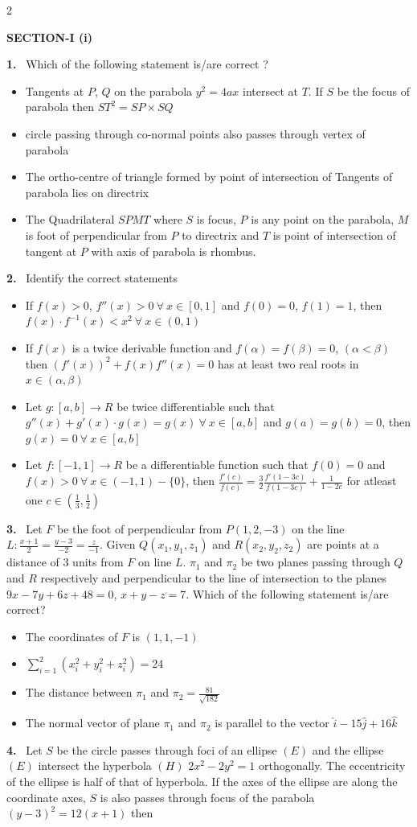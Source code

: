 \documentclass[10pt]{extarticle}
\newcommand{\partsec}[2]{\par\medskip\noindent{\large\bfseries PART-#1: #2}\par\smallskip}
\newcommand{\sect}[1]{\par\smallskip\noindent\textbf{#1}\par}
\newcommand{\qn}[1]{\par\smallskip\noindent\textbf{#1.}~}
\newenvironment{qoptions}{\begin{itemize}[leftmargin=1.8em,itemsep=1pt,topsep=2pt,label={}]}{\end{itemize}}
\newcommand{\opt}[2]{\item[(#1)] #2}
\begin{document}
\begin{multicols}{2}
\partsec{3}{MATHEMATICS}
\sect{SECTION-I (i)}
\qn{1} Which of the following statement is/are correct ?
\begin{qoptions}
\opt{A}{Tangents at $P$, $Q$ on the parabola $y^2=4ax$ intersect at $T$. If $S$ be the focus of parabola then $ST^2=SP\times SQ$}
\opt{B}{circle passing through co-normal points also passes through vertex of parabola}
\opt{C}{The ortho-centre of triangle formed by point of intersection of Tangents of parabola lies on directrix}
\opt{D}{The Quadrilateral $SPMT$ where $S$ is focus, $P$ is any point on the parabola, $M$ is foot of perpendicular from $P$ to directrix and $T$ is point of intersection of tangent at $P$ with axis of parabola is rhombus.}
\end{qoptions}
\qn{2} Identify the correct statements
\begin{qoptions}
\opt{A}{If $f(x)>0$, $f''(x)>0\ \forall\ x\in[0,1]$ and $f(0)=0$, $f(1)=1$, then $f(x)\cdot f^{-1}(x)<x^2\ \forall\ x\in(0,1)$}
\opt{B}{If $f(x)$ is a twice derivable function and $f(\alpha)=f(\beta)=0$, $(\alpha<\beta)$ then $(f'(x))^2+f(x)f''(x)=0$ has at least two real roots in $x\in(\alpha,\beta)$}
\opt{C}{Let $g:[a,b]\rightarrow R$ be twice differentiable such that $g''(x)+g'(x)\cdot g(x)=g(x)\ \forall\ x\in[a,b]$ and $g(a)=g(b)=0$, then $g(x)=0\ \forall\ x\in[a,b]$}
\opt{D}{Let $f:[-1,1]\rightarrow R$ be a differentiable function such that $f(0)=0$ and $f(x)>0\ \forall\ x\in(-1,1)-\{0\}$, then $\frac{f'(c)}{f(c)}=\frac32\frac{f'(1-3c)}{f(1-3c)}+\frac{1}{1-2c}$ for atleast one $c\in\left(\frac13,\frac12\right)$}
\end{qoptions}
\qn{3} Let $F$ be the foot of perpendicular from $P(1,2,-3)$ on the line $L:\frac{x+1}{2}=\frac{y-3}{-2}=\frac{z}{-1}$. Given $Q(x_1,y_1,z_1)$ and $R(x_2,y_2,z_2)$ are points at a distance of 3 units from $F$ on line $L$. $\pi_1$ and $\pi_2$ be two planes passing through $Q$ and $R$ respectively and perpendicular to the line of intersection to the planes $9x-7y+6z+48=0$, $x+y-z=7$. Which of the following statement is/are correct?
\begin{qoptions}
\opt{A}{The coordinates of $F$ is $(1,1,-1)$}
\opt{B}{$\sum_{i=1}^{2}(x_i^2+y_i^2+z_i^2)=24$}
\opt{C}{The distance between $\pi_1$ and $\pi_2=\frac{81}{\sqrt{182}}$}
\opt{D}{The normal vector of plane $\pi_1$ and $\pi_2$ is parallel to the vector $\hat i-15\hat j+16\hat k$}
\end{qoptions}
\qn{4} Let $S$ be the circle passes through foci of an ellipse $(E)$ and the ellipse $(E)$ intersect the hyperbola $(H)$ $2x^2-2y^2=1$ orthogonally. The eccentricity of the ellipse is half of that of hyperbola. If the axes of the ellipse are along the coordinate axes, $S$ is also passes through focus of the parabola $(y-3)^2=12(x+1)$ then

\end{multicols}
\end{document}
